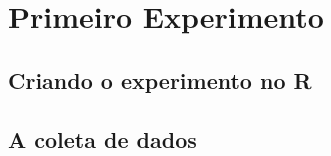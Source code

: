 \chapter{Primeiro Experimento}
\label{chap:primeiro_experimento}


\section{Criando o experimento no R}
\label{sec:primeiro_experimento_criando o experimento_no_R}


\section{A coleta de dados}
\label{sec:primeiro_experimento_a_coleta_de_dados}

